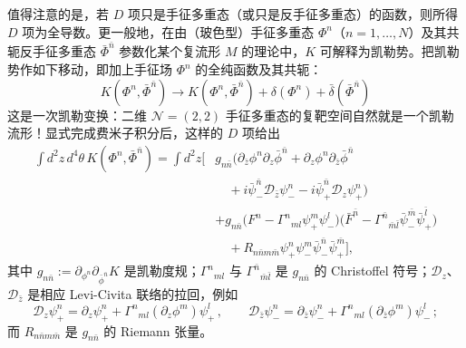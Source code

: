 值得注意的是，若 $D$ 项只是手征多重态（或只是反手征多重态）的函数，则所得 $D$ 项为全导数。更一般地，在由（玻色型）手征多重态 $\Phi^n$（$n=1,\dots,N$）及其共轭反手征多重态 $\bar\Phi^{\bar n}$ 参数化某个复流形 $M$ 的理论中，$K$ 可解释为凯勒势。把凯勒势作如下移动，即加上手征场 $\Phi^n$ 的全纯函数及其共轭：
\begin{equation}
K(\Phi^n,\bar\Phi^{\bar n})\to K(\Phi^n,\bar\Phi^{\bar n})+\delta(\Phi^n)+\bar\delta(\bar\Phi^{\bar n})
\tag{2.22}
\end{equation}
这是一次凯勒变换：二维 $\mathcal{N}=(2,2)$ 手征多重态的复靶空间自然就是一个凯勒流形！显式完成费米子积分后，这样的 $D$ 项给出
\begin{equation}\tag{2.23}
\begin{aligned}
\int d^2z\,d^4\theta\, K(\Phi^n,\bar\Phi^{\bar n}) = \int d^2z\bigg[& g_{n\bar n}\big(\partial_{\bar z}\phi^n\partial_z\bar\phi^{\bar n}+\partial_z\phi^n\partial_{\bar z}\bar\phi^{\bar n}\\
&\quad +i\bar\psi^{\bar n}_-\mathcal{D}_{\bar z}\psi^n_- - i\bar\psi^{\bar n}_+\mathcal{D}_z\psi^n_+\big)\\
&+g_{n\bar n}\big(F^n-\Gamma^n{}_{ml}\psi^m_+\psi^l_-\big)\big(\bar F^{\bar n}-\Gamma^{\bar n}{}_{\bar m\bar l}\bar\psi^{\bar m}_-\bar\psi^{\bar l}_+\big)\\
&\quad +R_{n\bar n m\bar m}\psi^n_+\psi^m_-\bar\psi^{\bar n}_-\bar\psi^{\bar m}_+\bigg],
\end{aligned}
\end{equation}
其中 $g_{n\bar n}:=\partial_{\phi^n}\partial_{\bar\phi^{\bar n}}K$ 是凯勒度规；$\Gamma^n{}_{ml}$ 与 $\Gamma^{\bar n}{}_{\bar m\bar l}$ 是 $g_{n\bar n}$ 的 Christoffel 符号；$\mathcal{D}_z$、$\mathcal{D}_{\bar z}$ 是相应 Levi-Civita 联络的拉回，例如
\begin{equation}\tag{2.24}
\mathcal{D}_z\psi^n_+=\partial_z\psi^n_++\Gamma^n{}_{ml}(\partial_z\phi^m)\psi^l_+\,,\qquad
\mathcal{D}_{\bar z}\psi^n_-=\partial_{\bar z}\psi^n_-+\Gamma^n{}_{ml}(\partial_{\bar z}\phi^m)\psi^l_-\,;
\end{equation}
而 $R_{n\bar n m\bar m}$ 是 $g_{n\bar n}$ 的 Riemann 张量。


